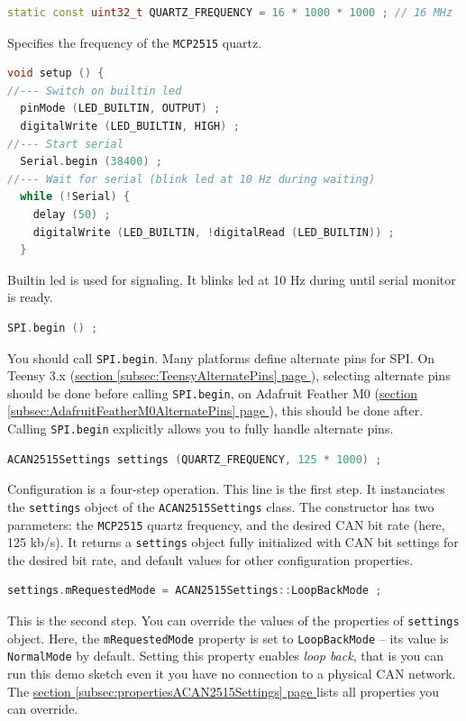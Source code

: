 \documentclass[9pt, a4paper, obeyspaces]{extarticle}
\newcommand\refSubsectionPage[1]{\hyperref[subsec:#1]{section \ref*{subsec:#1} page \pageref{subsec:#1}}}
\begin{document}
{ \small\begin{lstlisting}[language=c++]
static const uint32_t QUARTZ_FREQUENCY = 16 * 1000 * 1000 ; // 16 MHz
\end{lstlisting}}

Specifies the frequency of the \texttt{MCP2515} quartz.








{ \small\begin{lstlisting}[language=c++]
void setup () {
//--- Switch on builtin led
  pinMode (LED_BUILTIN, OUTPUT) ;
  digitalWrite (LED_BUILTIN, HIGH) ;
//--- Start serial
  Serial.begin (38400) ;
//--- Wait for serial (blink led at 10 Hz during waiting)
  while (!Serial) {
    delay (50) ;
    digitalWrite (LED_BUILTIN, !digitalRead (LED_BUILTIN)) ;
  }
\end{lstlisting}}
Builtin led is used for signaling. It blinks led at 10 Hz during until serial monitor is ready.



{ \small\begin{lstlisting}[language=c++]
  SPI.begin () ;
\end{lstlisting}}
You should call \texttt{SPI.begin}. Many platforms define alternate pins for SPI. On Teensy 3.x (\refSubsectionPage{TeensyAlternatePins}), selecting alternate pins should be done before calling \texttt{SPI.begin}, on Adafruit Feather M0 (\refSubsectionPage{AdafruitFeatherM0AlternatePins}), this should be done after. Calling \texttt{SPI.begin} explicitly allows you to fully handle alternate pins.

{ \small\begin{lstlisting}[language=c++]
  ACAN2515Settings settings (QUARTZ_FREQUENCY, 125 * 1000) ;
\end{lstlisting}}

Configuration is a four-step operation. This line is the first step. It instanciates the \texttt{settings} object of the \texttt{ACAN2515Settings} class. The constructor has two parameters: the \texttt{MCP2515} quartz frequency, and the desired CAN bit rate (here, 125 kb/s). It returns a \texttt{settings} object fully initialized with CAN bit settings for the desired bit rate, and default values for other configuration properties.






{ \small\begin{lstlisting}[language=c++]
  settings.mRequestedMode = ACAN2515Settings::LoopBackMode ;
\end{lstlisting}}
This is the second step. You can override the values of the properties of \texttt{settings} object. Here, the \texttt{mRequestedMode} property is set to \texttt{LoopBackMode} -- its value is \texttt{NormalMode} by default. Setting this property enables \emph{loop back}, that is you can run this demo sketch even it you have no connection to a physical CAN network. The \refSubsectionPage{propertiesACAN2515Settings} lists all properties you can override.
\end{document}
